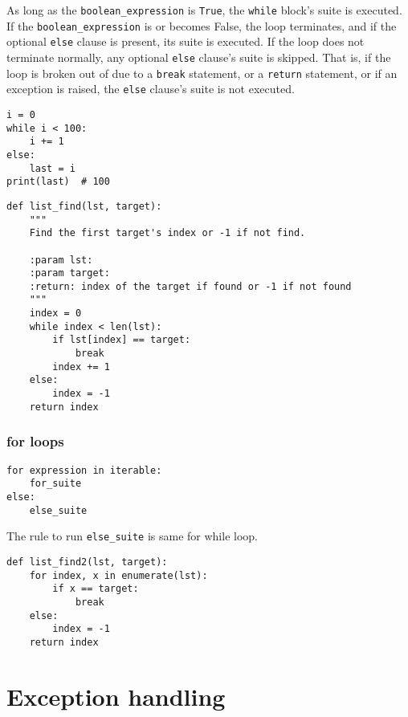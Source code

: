 As long as the \verb|boolean_expression| is \verb|True|, the \verb|while| block's suite is executed.
If the \verb|boolean_expression| is or becomes False, the loop terminates, and if the optional \verb|else| clause is present, its suite is executed.
If the loop does not terminate normally, any optional \verb|else| clause's suite is skipped.
That is, if the loop is broken out of due to a \verb|break| statement, or a \verb|return| statement, or if an exception is raised, the \verb|else| clause's suite is not executed.


\begin{lstlisting}
i = 0
while i < 100:
    i += 1
else:
    last = i
print(last)  # 100
\end{lstlisting}

\begin{lstlisting}
def list_find(lst, target):
    """
    Find the first target's index or -1 if not find.

    :param lst:
    :param target:
    :return: index of the target if found or -1 if not found
    """
    index = 0
    while index < len(lst):
        if lst[index] == target:
            break
        index += 1
    else:
        index = -1
    return index  
\end{lstlisting}




\subsubsection{for loops}
\begin{tcolorbox}

\begin{verbatim}
for expression in iterable:
    for_suite
else:
    else_suite
\end{verbatim}
  
\end{tcolorbox}

The rule to run \verb|else_suite| is same for while loop.

\begin{lstlisting}
def list_find2(lst, target):
    for index, x in enumerate(lst):
        if x == target:
            break
    else:
        index = -1
    return index  
\end{lstlisting}


\section{Exception handling}

